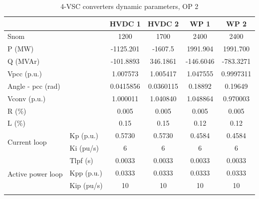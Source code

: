 \documentclass{report}
\begin{document}
\begin{table}[H]
\centering
\caption{4-VSC converters dynamic parameters, OP 2}
\begin{tabular}{ll|c|c|c|c}
\multicolumn{2}{l|}{}                                                  & HVDC 1    & HVDC 2    & WP 1      & WP 2      \\ \hline
\multicolumn{2}{l|}{Snom}                                              & 1200      & 1700      & 2400      & 2400      \\ \hline
\multicolumn{2}{l|}{P (MW)}                                            & -1125.201 & -1607.5   & 1991.904  & 1991.700  \\ \hline
\multicolumn{2}{l|}{Q (MVAr)}                                          & -101.8893 & 346.1861  & -146.6046 & -783.3271 \\ \hline
\multicolumn{2}{l|}{Vpcc (p.u.)}                                              & 1.007573  & 1.005417  & 1.047555  & 0.9997311 \\ \hline
\multicolumn{2}{l|}{Angle - pcc (rad)}                                 &   0.0415856        & 0.0360115           &    0.18892       &   0.19649         \\ \hline
\multicolumn{2}{l|}{Vconv (p.u.)}                                      & 1.000011  & 1.040840  & 1.048864  & 0.970003  \\ \hline
\multicolumn{2}{l|}{R (\%)}                                                 & 0.005     & 0.005     & 0.005     & 0.005     \\ \hline
\multicolumn{2}{l|}{L (\%)}                                                 & 0.15      & 0.15      & 0.12      & 0.12      \\ \hline
\multicolumn{1}{l|}{\multirow{2}{*}{Current loop}}        & Kp (p.u.)        & 0.5730    & 0.5730    & 0.4584    & 0.4584    \\ \cline{2-6} 
\multicolumn{1}{l|}{}                                     & Ki (pu/s)        & 6         & 6         & 6         & 6         \\ \hline
\multicolumn{1}{l|}{\multirow{6}{*}{Active power loop}}   & Tlpf (s)      & 0.0033    & 0.0033    & 0.0033    & 0.0033    \\ \cline{2-6} 
\multicolumn{1}{l|}{}                                     & Kpp (p.u.)       & 0.0333    & 0.0333    & 0.0333    & 0.0333    \\ \cline{2-6} 
\multicolumn{1}{l|}{}                                     & Kip (pu/s)       & 10        & 10        & 10        & 10        \\ \cline{2-6} 

\end{tabular}
\end{table}
\end{document}
